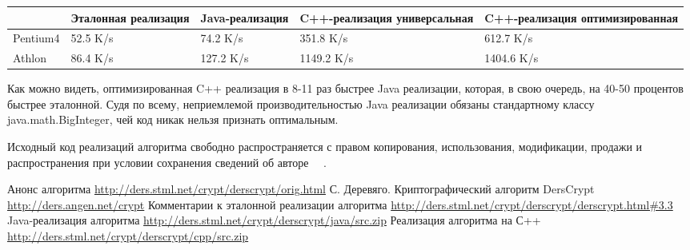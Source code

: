 \documentclass[10pt, a5paper]{article}
\begin{document}
\begin{table}[h!]
  \centering
  \begin{tabular}{|p{1.5cm}|p{1.8cm}|p{1.8cm}|p{1.8cm}|p{1.8cm}|}
\hline
                  & Эталонная реализация &  Java-реализация  &  C++-реализация универсальная  &  C++-реализация оптимизированная  \\
\hline
     Pentium4    &  52.5 K/s            &  74.2 K/s         &  351.8 K/s     &             612.7 K/s      \\
\hline
     Athlon       &  86.4 K/s            &  127.2 K/s        &  1149.2 K/s    &  1404.6 K/s     \\
\hline
  \end{tabular}
\end{table}

Как можно видеть, оптимизированная C++ реализация в 8-11 раз быстрее Java реализации, которая, в свою очередь, на 40-50 процентов быстрее эталонной. Судя по всему, неприемлемой производительностью Java реализации обязаны стандартному классу java.math.BigInteger, чей код никак нельзя признать оптимальным.

Исходный код реализаций алгоритма свободно распространяется с правом копирования, использования, модификации, продажи и распространения при условии сохранения сведений об авторе~\cite{Derevyago4} ~\cite{Derevyago5}.

\begin{thebibliography}{99}
 Анонс алгоритма \url{http://ders.stml.net/crypt/derscrypt/orig.html}
 С. Деревяго. Криптографический алгоритм DersCrypt \url{http://ders.angen.net/crypt}
 Комментарии к эталонной реализации алгоритма \url{http://ders.stml.net/crypt/derscrypt/derscrypt.html#3.3}
 Java-реализация алгоритма \url{http://ders.stml.net/crypt/derscrypt/java/src.zip}
 Реализация алгоритма на С++ \url{http://ders.stml.net/crypt/derscrypt/cpp/src.zip}
\end{thebibliography}
\end{document}
